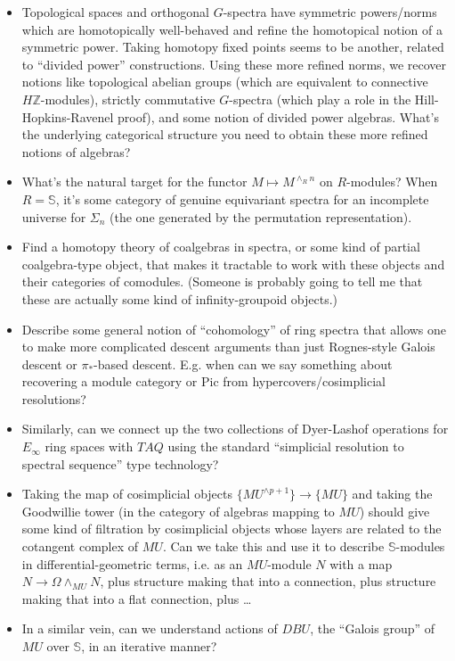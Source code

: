 \documentclass[12pt,titlepage]{article}
\theoremstyle{plain}
\theoremstyle{definition}
\theoremstyle{remark}
\begin{document}
\begin{itemize}%
\item Topological spaces and orthogonal $G$-spectra have symmetric powers/norms which are homotopically well-behaved and refine the homotopical notion of a symmetric power. Taking homotopy fixed points seems to be another, related to ``{}divided power''{} constructions. Using these more refined norms, we recover notions like topological abelian groups (which are equivalent to connective $H\mathbb{Z}$-modules), strictly commutative $G$-spectra (which play a role in the Hill-Hopkins-Ravenel proof), and some notion of divided power algebras. What'{}s the underlying categorical structure you need to obtain these more refined notions of algebras?
\item What'{}s the natural target for the functor $M \mapsto M^{\wedge_{R}
n}$ on $R$-modules? When $R = \mathbb{S}$, it'{}s some category of genuine equivariant spectra for an incomplete universe for $\Sigma_n$ (the one generated by the permutation representation).
\item Find a homotopy theory of coalgebras in spectra, or some kind of partial coalgebra-type object, that makes it tractable to work with these objects and their categories of comodules. (Someone is probably going to tell me that these are actually some kind of infinity-groupoid objects.)
\item Describe some general notion of ``{}cohomology''{} of ring spectra that allows one to make more complicated descent arguments than just Rognes-style Galois descent or $\pi_*$-based descent. E.g. when can we say something about recovering a module category or Pic from hypercovers/cosimplicial resolutions?
\item Similarly, can we connect up the two collections of Dyer-Lashof operations for $E_\infty$ ring spaces with $TAQ$ using the standard ``{}simplicial resolution to spectral sequence''{} type technology?
\item Taking the map of cosimplicial objects $\{MU^{\wedge p+1}\} \to
\{MU\}$ and taking the Goodwillie tower (in the category of algebras mapping to $MU$) should give some kind of filtration by cosimplicial objects whose layers are related to the cotangent complex of $MU$. Can we take this and use it to describe $\mathbb{S}$-modules in differential-geometric terms, i.e. as an $MU$-module $N$ with a map $N \to \Omega \wedge_{MU} N$, plus structure making that into a connection, plus structure making that into a flat connection, plus \ldots{}
\item In a similar vein, can we understand actions of $DBU$, the ``{}Galois group''{} of $MU$ over $\mathbb{S}$, in an iterative manner?

\end{itemize}
\end{document}
